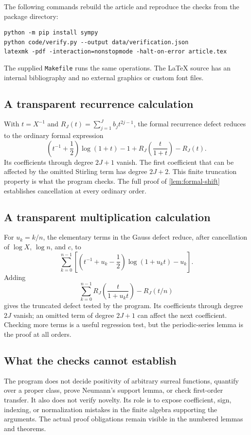 \documentclass[11pt,letterpaper]{article}
\numberwithin{equation}{section}
\theoremstyle{plain}
\theoremstyle{definition}
\theoremstyle{remark}
\begin{document}
The following commands rebuild the article and reproduce the checks from the
package directory:
\begin{verbatim}
python -m pip install sympy
python code/verify.py --output data/verification.json
latexmk -pdf -interaction=nonstopmode -halt-on-error article.tex
\end{verbatim}
The supplied \texttt{Makefile} runs the same operations. The LaTeX source has
an internal bibliography and no external graphics or custom font files.

\subsection{A transparent recurrence calculation}
With $t=X^{-1}$ and $R_J(t)=\sum_{j=1}^Jb_jt^{2j-1}$, the formal recurrence
defect reduces to the ordinary formal expression
\begin{equation}\label{eq:verify-recurrence}
 \left(t^{-1}+\frac12\right)\log(1+t)-1
 +R_J\left(\frac{t}{1+t}\right)-R_J(t).
\end{equation}
Its coefficients through degree $2J+1$ vanish. The first coefficient that
can be affected by the omitted Stirling term has degree $2J+2$.
This finite truncation property is what the program checks. The full proof
of \cref{lem:formal-shift} establishes cancellation at every ordinary order.

\subsection{A transparent multiplication calculation}
For $u_k=k/n$, the elementary terms in the Gauss defect reduce, after
cancellation of $\log X$, $\log n$, and $c$, to
\[
 \sum_{k=0}^{n-1}\left[
 \left(t^{-1}+u_k-\frac12\right)\log(1+u_kt)-u_k\right].
\]
Adding
\[
 \sum_{k=0}^{n-1}R_J\left(\frac{t}{1+u_kt}\right)-R_J(t/n)
\]
gives the truncated defect tested by the program. Its coefficients through
degree $2J$ vanish; an omitted term of degree $2J+1$ can affect the next
coefficient. Checking more terms is a useful regression test, but the
periodic-series lemma is the proof at all orders.

\subsection{What the checks cannot establish}
The program does not decide positivity of arbitrary surreal functions,
quantify over a proper class, prove Neumann's support lemma, or check
first-order transfer. It also does not verify novelty. Its role is to expose
coefficient, sign, indexing, or normalization mistakes in the finite algebra
supporting the arguments. The actual proof obligations remain visible in
the numbered lemmas and theorems.
\end{document}
